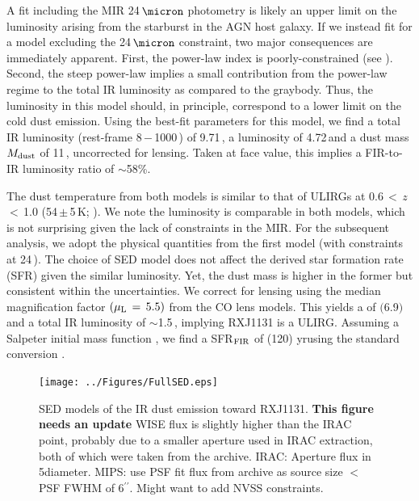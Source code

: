 \documentclass[]{emulateapj}
\begin{document}
A fit including the MIR 24\,$\micron$ photometry
is likely an upper limit on the \fir luminosity arising from the starburst
in the AGN host galaxy.
If we instead fit for a model excluding the 24\,$\micron$ constraint,
two major consequences are immediately apparent.
First, the power-law index is poorly-constrained (see ).
Second, the steep power-law implies a small contribution
from the power-law regime
to the total IR luminosity as compared to the graybody.
Thus, the \fir luminosity in
this model should, in principle, correspond to a
lower limit on the cold dust emission.
Using the best-fit parameters
for this model, we find a total IR luminosity
\LIR (rest-frame 8\,$-$\,1000\,\micron) of 9.71\,\Lsun,
a \fir luminosity \LFIR of 4.72\,\Lsun and a
dust mass $M_{\rm dust}$ of 11\,\Msun, uncorrected for lensing.
Taken at face value, this implies a FIR-to-IR luminosity ratio
of $\sim$58\%.

The dust temperature from both models is similar to that of
ULIRGs at 0.6\,$<$\,$z$\,$<$\,1.0 (54\,$\pm$\,5\,K; \citealt[hereafter C13]{Combes13a}).
We note the \fir luminosity is comparable in both models, which is
not surprising given the lack of constraints in the MIR. 
For the subsequent analysis, we adopt the physical quantities
from the first model (\ie with constraints at 24\,\micron).
The choice of SED model does not affect
the derived star formation rate (SFR) given the similar \fir luminosity.
Yet, the dust mass is higher in the former but consistent within the
uncertainties.
We correct for lensing using the median magnification
factor $(\mu_{\rm L}\,=\,5.5)$
from the CO lens models. This yields a
 \LFIR of $($6.9$)$\,\Lsun
 and 
 a total IR luminosity of $\sim$1.5\,\Lsun,  implying RXJ1131 is a ULIRG.
Assuming a Salpeter initial
mass function \citep{Salpeter55a}, we find a
SFR$_{\rm FIR}$ of (120)\,\Msun\,yr\pmOne using the
standard conversion \citep{Kennicutt98a}.

\begin{figure}[!htbp]
\centering
\texttt{[image: ../Figures/FullSED.eps]}
\caption{SED models of the IR dust emission toward RXJ1131.
{\bf This figure needs an update}
WISE flux is slightly higher than the IRAC point, probably due to a smaller
aperture used in IRAC extraction,
both of which were taken from the archive.
IRAC: Aperture flux in 5\farcs diameter.
MIPS: use PSF fit flux from archive as source size $<$ PSF FWHM of 6$^{\prime\prime}$.
Might want to add NVSS constraints.
\label{fig:SED}}
\end{figure}
\end{document}
